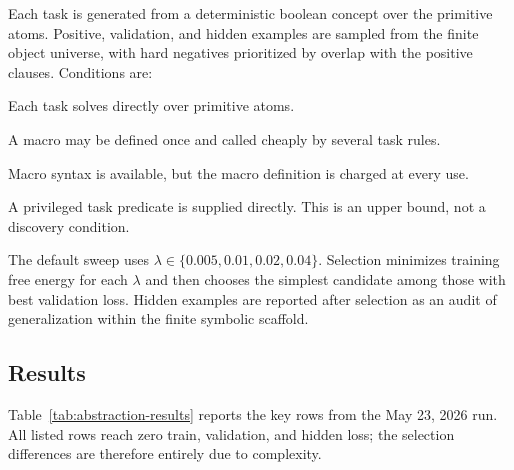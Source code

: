 \documentclass[11pt]{article}
\begin{document}
Each task is generated from a deterministic boolean concept over the primitive
atoms. Positive, validation, and hidden examples are sampled from the finite
object universe, with hard negatives prioritized by overlap with the positive
clauses. Conditions are:
\begin{description}[leftmargin=2.2em,style=nextline]
  \item[inline]
  Each task solves directly over primitive atoms.
  \item[shared]
  A macro may be defined once and called cheaply by several task rules.
  \item[no\_share]
  Macro syntax is available, but the macro definition is charged at every use.
  \item[oracle]
  A privileged task predicate is supplied directly. This is an upper bound, not
  a discovery condition.
\end{description}
The default sweep uses $\lambda\in\{0.005,0.01,0.02,0.04\}$. Selection minimizes
training free energy for each $\lambda$ and then chooses the simplest candidate
among those with best validation loss. Hidden examples are reported after
selection as an audit of generalization within the finite symbolic scaffold.

\subsection{Results}

Table~\ref{tab:abstraction-results} reports the key rows from the May 23, 2026
run. All listed rows reach zero train, validation, and hidden loss; the
selection differences are therefore entirely due to complexity.
\end{document}
